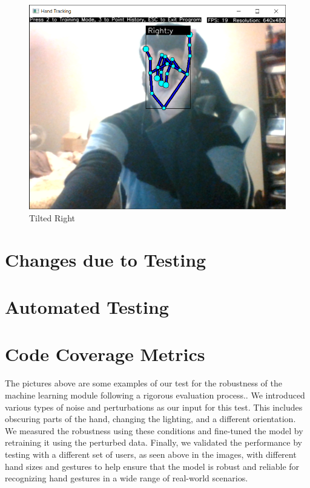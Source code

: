 \documentclass[12pt, titlepage]{article}
\begin{document}
\begin{figure}[!htb]
  \includegraphics[width=\linewidth]{tiltedr_y.png}
  \caption{Tilted Right}\label{fig:Tilted Right}
\endminipage\hfill

\end{figure}


\blindtext

\section{Changes due to Testing}


\section{Automated Testing}


\section{Code Coverage Metrics}





The pictures above are some examples of our test for the robustness of the machine learning module following a 
rigorous evaluation process.. We introduced various types of noise and perturbations as our input for this test.
 This includes obscuring parts of the hand, changing the lighting, and a different orientation. We measured 
 the robustness using these conditions and fine-tuned the model by retraining it using the perturbed data. 
 Finally, we validated the performance by testing with a different set of users, as seen above in the images,
  with different hand sizes and gestures to help ensure that the model is robust and reliable for recognizing 
  hand gestures in a wide range of real-world scenarios.
\end{document}
